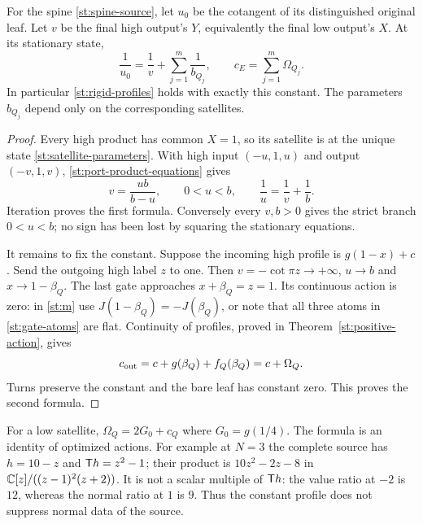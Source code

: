 \begin{theorem}\label{st:profiles}
For the spine \eqref{st:spine-source}, let $u_0$
be the cotangent of its distinguished original leaf.
Let $v$ be the final high output's $Y$, equivalently
the final low output's $X$. At its stationary state,
\begin{equation}\label{st:harmonic}
 \frac1{u_0}=\frac1v+\sum_{j=1}^m\frac1{b_{Q_j}},
 \qquad
 c_E=\sum_{j=1}^m\Omega_{Q_j}.
\end{equation}
In particular \eqref{st:rigid-profiles} holds with
exactly this constant. The parameters $b_{Q_j}$
depend only on the corresponding satellites.
\end{theorem}
\begin{proof}
Every high product has common $X=1$, so its satellite
is at the unique state \eqref{st:satellite-parameters}.
With high input $(-u,1,u)$ and output $(-v,1,v)$,
\eqref{st:port-product-equations} gives
\begin{equation}\label{st:one-response}
 v=\frac{ub}{b-u},\qquad
 0<u<b,\qquad \frac1u=\frac1v+\frac1b .
\end{equation}
Iteration proves the first formula. Conversely every
$v,b>0$ gives the strict branch $0<u<b$; no sign
has been lost by squaring the stationary equations.

It remains to fix the constant. Suppose the incoming
high profile is $g(1-x)+c$. Send the outgoing high
label $z$ to one. Then
$v=-\cot\pi z\to+\infty$, $u\to b$ and
$x\to1-\beta_Q$. The last gate approaches
$x+\beta_Q=z=1$. Its continuous action is zero:
in \eqref{st:m} use $J(1-\beta_Q)=-J(\beta_Q)$,
or note that all three atoms in
\eqref{st:gate-atoms} are flat.
Continuity of profiles, proved in
Theorem~\ref{st:positive-action}, gives
\[
 c_{\rm out}=c+g(\beta_Q)+f_Q(\beta_Q)=c+\Omega_Q.
\]
Turns preserve the constant and the bare leaf has
constant zero. This proves the second formula.
\end{proof}
For a low satellite, $\Omega_Q=2G_0+c_Q$ where
$G_0=g(1/4)$. The formula is an identity of optimized
actions. For example at $N=3$ the complete source has
$h=10-z$ and $\mathsf T h=z^2-1$; their product is
$10z^2-2z-8$ in
$\mathbb C[z]/((z-1)^2(z+2))$. It is not a scalar
multiple of $\mathsf T h$: the value ratio at $-2$ is
$12$, whereas the normal ratio at $1$ is $9$.
Thus the constant profile does not suppress normal
data of the source.

